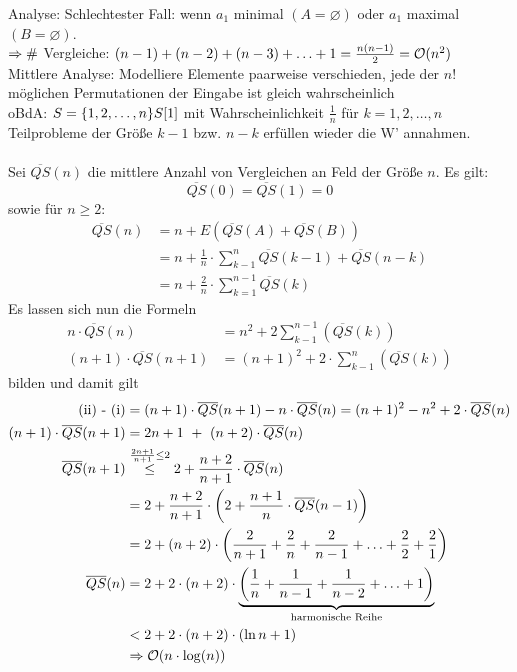         Analyse: Schlechtester Fall: wenn $a_1$ minimal $(A = \varnothing)$ oder $a_1$ maximal $(B = \varnothing)$. \\
        $\Ra \#$ Vergleiche: $(n-1)+(n-2)+(n-3) + \ldots + 1 = \frac{n(n-1)}{2} = \mathcal{O}(n^2)$ \\
        Mittlere Analyse: Modelliere Elemente paarweise verschieden, jede der $n!$ möglichen Permutationen der Eingabe ist gleich wahrscheinlich\\
        oBdA: $S = \{1,2,\ldots, n \} \\ S[1]$ mit Wahrscheinlichkeit $\frac{1}{n}$ für $k=1,2,\ldots, n$ \\
        Teilprobleme der Größe $k-1$ bzw. $n - k$ erfüllen wieder die W' annahmen. \\\\
        Sei $\overline{QS}(n)$ die mittlere Anzahl von Vergleichen an Feld der Grö\ss e $n$. Es gilt:
        $$\overline{QS} (0) = \overline{QS}(1) = 0$$
        sowie für $n \geq 2$: 
        \begin{align*}
            \overline{QS}(n) &= n + E(\overline{QS}(A)+ \overline{QS}(B))  \\
            &= n + \frac{1}{n} \cdot \sum \limits_{k-1}^n \overline{QS} (k-1) + \overline{QS}(n-k) \\
            &= n + \frac{2}{n} \cdot \sum \limits_{k=1}^{n-1} \overline{QS} (k)
        \end{align*} 
        Es lassen sich nun die Formeln
        \begin{align*}
            n \cdot \overline{QS}(n) &= n^2 + 2 \sum \limits_{k-1}^{n-1} \left( \overline{QS}(k) \right) \tag{i} \\
            (n+1) \cdot \overline{QS} (n+1) &= (n+1)^2 + 2 \cdot \sum \limits_{k-1}^n \left( \overline{QS}(k) \right) \tag{ii}
        \end{align*}
        bilden und damit gilt
        \begin{align*}
            \text{(ii) - (i)} &= (n+1) \cdot \overline{QS}(n+1) - n \cdot \overline{QS}(n) = (n+1)^2 -n^2 +2 \cdot \overline{QS}(n) \\
            (n+1) \cdot \overline{QS} (n+1) &= 2n+1~+~(n+2)\cdot \overline{QS} (n) \\
            \overline{QS} (n+1) & \overset{\frac{2n+1}{n+1}\le 2}{\le} 2 + \frac{n+2}{n+1} \cdot \overline{QS} (n) \\
            &= 2 + \frac{n+2}{n+1}\cdot \left( 2+ \frac{n+1}{n} \cdot \overline{QS} (n-1) \right) \\
            &= 2 + (n+2) \cdot \left( \frac{2}{n+1} + \frac{2}{n} + \frac{2}{n-1} + \ldots + \frac{2}{2} + \frac{2}{1} \right) \\
            \overline{QS} (n) &= 2 + 2 \cdot (n+2) 
            	\cdot \underbrace{\left( \frac{1}{n} + \frac{1}{n-1} + \frac{1}{n-2} + \ldots + 1 \right)}_{\text{harmonische Reihe}} \\
            &< 2 + 2 \cdot (n+2) \cdot \left( \ln n + 1 \right) \\
            &\Rightarrow \LO(n \cdot \log(n))
        \end{align*}


